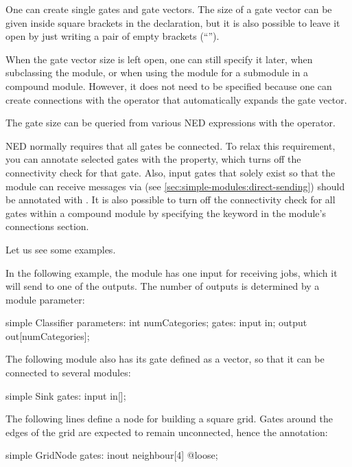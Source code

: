 One can create single gates and gate vectors. The size of a gate vector
can be given inside square brackets in the declaration, but it is also possible
to leave it open by just writing a pair of empty brackets (``\ttt{[]}'').

When the gate vector size is left open, one can still specify it later,
when subclassing the module, or when using the module for a submodule in a
compound module. However, it does not need to be specified because
one can create connections with the  operator that
automatically expands the gate vector.

The gate size can be queried from various NED expressions with the
 operator.

NED normally requires that all gates be connected. To relax this
requirement, you can annotate selected gates with the 
property, which turns off the connectivity check for that gate. Also, input
gates that solely exist so that the module can receive messages via
 (see \ref{sec:simple-modules:direct-sending}) should
be annotated with . It is also possible to turn off the connectivity
check for all gates within a compound module by specifying the
 keyword in the module's connections section.

Let us see some examples.

In the following example, the  module has one input for
receiving jobs, which it will send to one of the outputs. The number of
outputs is determined by a module parameter:

\begin{ned}
simple Classifier {
    parameters:
        int numCategories;
    gates:
        input in;
        output out[numCategories];
}
\end{ned}

The following  module also has its  gate defined
as a vector, so that it can be connected to several modules:

\begin{ned}
simple Sink {
    gates:
        input in[];
}
\end{ned}

The following lines define a node for building a square grid. Gates around
the edges of the grid are expected to remain unconnected, hence the
 annotation:

\begin{ned}
simple GridNode {
    gates:
        inout neighbour[4] @loose;
}
\end{ned}

